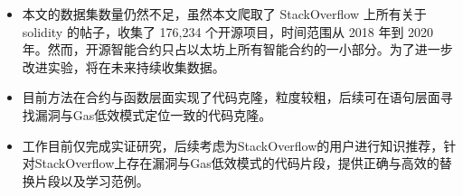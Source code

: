\begin{itemize}

    \item 本文的数据集数量仍然不足，虽然本文爬取了 StackOverflow 上所有关于solidity 的帖子，收集了 176,234 个开源项目，时间范围从 2018 年到 2020年。然而，开源智能合约只占以太坊上所有智能合约的一小部分。为了进一步改进实验，将在未来持续收集数据。
    
    \item 目前方法在合约与函数层面实现了代码克隆，粒度较粗，后续可在语句层面寻找漏洞与Gas低效模式定位一致的代码克隆。

    \item 工作目前仅完成实证研究，后续考虑为StackOverflow的用户进行知识推荐，针对StackOverflow上存在漏洞与Gas低效模式的代码片段，提供正确与高效的替换片段以及学习范例。
    

\end{itemize}




